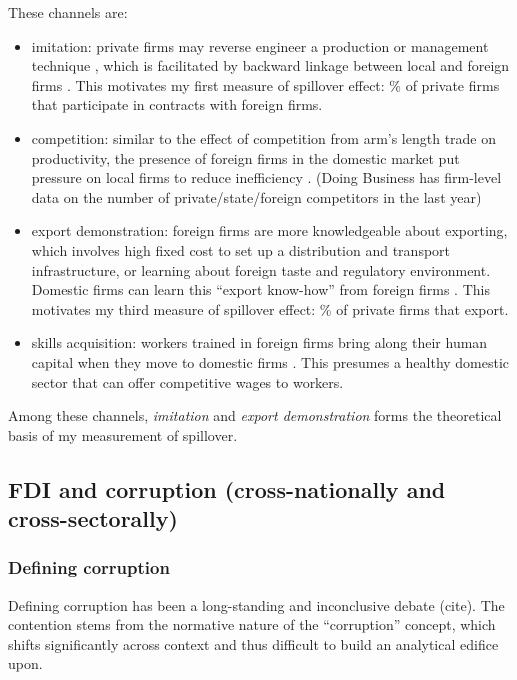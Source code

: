 These channels are:
\begin{itemize}
	\item imitation:  private firms may reverse engineer a production or management technique \citep{Wang1992}, which is facilitated by backward linkage between local and foreign firms \citep{Javorcik2004}. This motivates my first measure of spillover effect: \% of private firms that participate in contracts with foreign firms.
	\item competition: similar to the effect of competition from arm's length trade on productivity, the presence of foreign firms in the domestic market put pressure on local firms to reduce inefficiency \citep{Glass2002}. (Doing Business has firm-level data on the number of private/state/foreign competitors in the last year)
	\item export demonstration: foreign firms are more knowledgeable about exporting, which involves high fixed cost to set up a distribution and transport infrastructure, or learning about foreign taste and regulatory environment. Domestic firms can learn this ``export know-how'' from foreign firms \citep{Aitken1997}. This motivates my third measure of spillover effect: \% of private firms that export.
	\item skills acquisition: workers trained in foreign firms bring along their human capital when they move to domestic firms \citep{Djankov2000}. This presumes a healthy domestic sector that can offer competitive wages to workers.
\end{itemize}

Among these channels, \textit{imitation} and \textit{export demonstration} forms the theoretical basis of my measurement of spillover.

\subsection{FDI and corruption (cross-nationally and cross-sectorally)}

\subsubsection{Defining corruption}

Defining corruption has been a long-standing and inconclusive debate (cite). The contention stems from the normative nature of the ``corruption'' concept, which shifts significantly across context and thus difficult to build an analytical edifice upon. 

